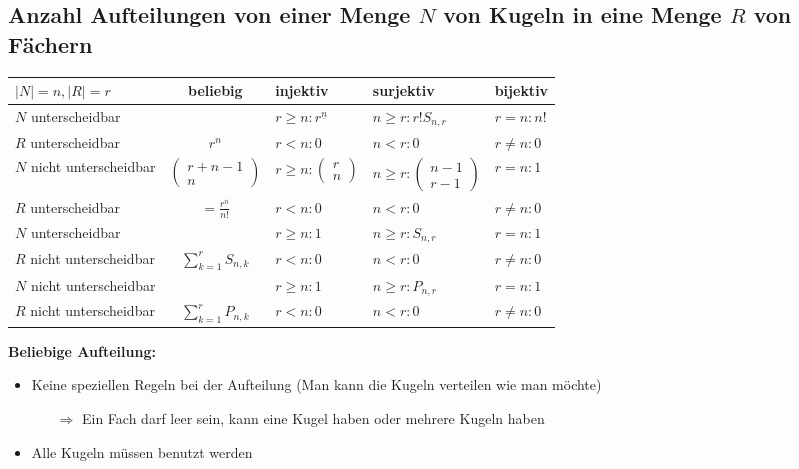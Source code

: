 \subsection{Anzahl Aufteilungen von einer Menge $N$ von Kugeln in eine Menge $R$ von Fächern}

\begin{table}[h]
\centering
\begin{tabular}{l|c|l|l|l}
$|N| = n, |R| = r$ & beliebig & injektiv & surjektiv & bijektiv\\
\hline
$N$ unterscheidbar & & $r \geq n : r^{\underline{n}}$ & $n \geq r : r!S_{n,r}$ & $r = n : n!$\\
$R$ unterscheidbar & $r^n$ & $r < n : 0$ & $n < r : 0$ & $r \neq n : 0$\\
\hline
$N$ nicht unterscheidbar & $\begin{pmatrix}r + n - 1\\ n\end{pmatrix}$ & $r \geq n : \begin{pmatrix}r\\ n\end{pmatrix}$ & $n \geq r: \begin{pmatrix}n-1\\ r-1\end{pmatrix}$ & $r = n : 1$\\
$R$ unterscheidbar & $\displaystyle = \frac{r^{\overline{n}}}{n!}$ & $r < n : 0$ & $n < r : 0$ & $r \neq n : 0$\\
\hline
$N$ unterscheidbar & & $r \geq n : 1$ &  $n \geq r : S_{n,r}$ & $r = n : 1$\\
$R$ nicht unterscheidbar & $\displaystyle \sum_{k=1}^{r}S_{n,k}$ & $r < n : 0$ & $n < r : 0$ & $r \neq n : 0$\\
\hline
$N$ nicht unterscheidbar & & $r \geq n : 1$ & $n \geq r : P_{n,r}$ & $r = n : 1$\\
$R$ nicht unterscheidbar & $\displaystyle \sum_{k=1}^{r} P_{n,k}$ & $r < n : 0$ & $n < r : 0$ & $r \neq n : 0$
\end{tabular}
\end{table}

\textbf{Beliebige Aufteilung:}

\begin{itemize}[leftmargin=*]
\item Keine speziellen Regeln bei der Aufteilung (Man kann die Kugeln verteilen wie man möchte)
\begin{itemize}
\item[$\Rightarrow$] Ein Fach darf leer sein, kann eine Kugel haben oder mehrere Kugeln haben
\end{itemize}
\item Alle Kugeln müssen benutzt werden
\end{itemize}\

